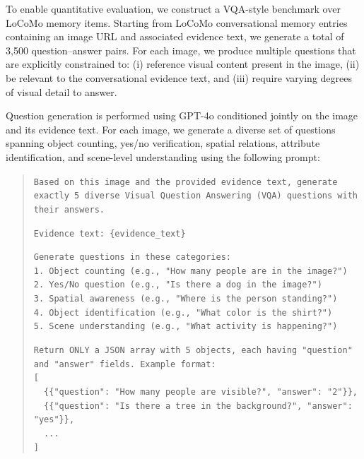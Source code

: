 To enable quantitative evaluation, we construct a VQA-style benchmark over LoCoMo memory items.
Starting from LoCoMo conversational memory entries containing an image URL and associated evidence text, we generate a total of 3,500 question--answer pairs.
For each image, we produce multiple questions that are explicitly constrained to:
(i) reference visual content present in the image,
(ii) be relevant to the conversational evidence text, and
(iii) require varying degrees of visual detail to answer.

Question generation is performed using GPT-4o conditioned jointly on the image and its evidence text.
For each image, we generate a diverse set of questions spanning object counting, yes/no verification, spatial relations, attribute identification, and scene-level understanding using the following prompt:

\begin{quote}
\small
\texttt{Based on this image and the provided evidence text, generate exactly 5 diverse Visual Question Answering (VQA) questions with their answers.}

\texttt{Evidence text: \{evidence\_text\}}

\texttt{Generate questions in these categories:}\\
\texttt{1. Object counting (e.g., "How many people are in the image?")}\\
\texttt{2. Yes/No question (e.g., "Is there a dog in the image?")}\\
\texttt{3. Spatial awareness (e.g., "Where is the person standing?")}\\
\texttt{4. Object identification (e.g., "What color is the shirt?")}\\
\texttt{5. Scene understanding (e.g., "What activity is happening?")}

\texttt{Return ONLY a JSON array with 5 objects, each having "question" and "answer" fields. Example format:}\\
\texttt{[}\\
\texttt{\ \ \{\{"question": "How many people are visible?", "answer": "2"\}\},}\\
\texttt{\ \ \{\{"question": "Is there a tree in the background?", "answer": "yes"\}\},}\\
\texttt{\ \ ...}\\
\texttt{]}
\end{quote}

